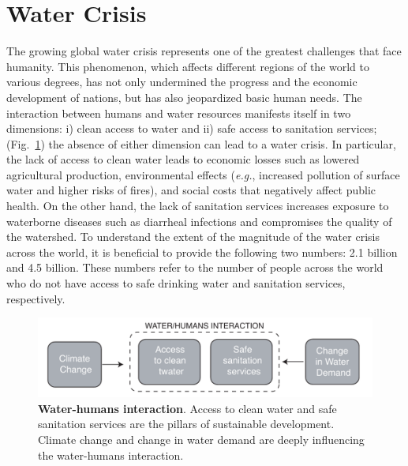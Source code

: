 \justifying
\section{Water Crisis}
The growing global water crisis represents one of the greatest challenges that face humanity. This phenomenon, which affects different regions of the world to various degrees, has not only undermined the progress and the economic development of nations, but has also jeopardized basic human needs. The interaction between humans and water resources manifests itself in two dimensions: i) clean access to water and ii) safe access to sanitation services; (Fig.~\ref{fig1_intro}) the absence of either dimension can lead to a water crisis. In particular, the lack of access to clean water leads to economic losses such as lowered agricultural production, environmental effects (\textit{e.g.}, increased pollution of surface water and higher risks of fires), and social costs that negatively affect public health. On the other hand, the lack of sanitation services increases exposure to waterborne diseases such as diarrheal infections and compromises the quality of the watershed. To understand the extent of the magnitude of the water crisis across the world, it is beneficial to provide the following two numbers: 2.1 billion and 4.5 billion. These numbers refer to the number of people across the world who do not have access to safe drinking water and sanitation services, respectively.\cite{WB}
\begin{figure}
  \centering
  \includegraphics[width=6in]{intro/Fig1.pdf}
  \caption{\textbf{Water-humans interaction}. Access to clean water and safe sanitation services are the pillars of sustainable development. Climate change and change in water demand are deeply influencing the water-humans interaction.}
  \label{fig1_intro}
\end{figure}
 
